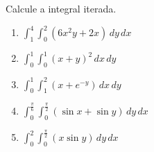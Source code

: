 



	
	
	\vspace{5mm}
	
	Calcule a integral iterada.
	
	\begin{enumerate}
		
		\item $\displaystyle \int_{1}^{4} \int_{0}^{2} (6x^{2}y + 2x) \, dy \, dx$ 
		
		\item $\displaystyle \int_{0}^{1} \int_{0}^{1} (x + y)^2 \, dx \, dy$ 
		
		\item $\displaystyle \int_{0}^{1} \int_{1}^{2} (x + e^{-y}) \, dx \, dy$ 
		
		\item $\displaystyle \int_{0}^{\frac{\pi}{6}} \int_{0}^{\frac{\pi}{2}} (\sin x + \sin y) \, dy \, dx$ 
		
		\item $\displaystyle \int_{0}^{2} \int_{0}^{\frac{\pi}{2}} (x \sin y) \, dy \, dx$ 
		
	\end{enumerate}
		
	\vspace{5mm}	
	
	


